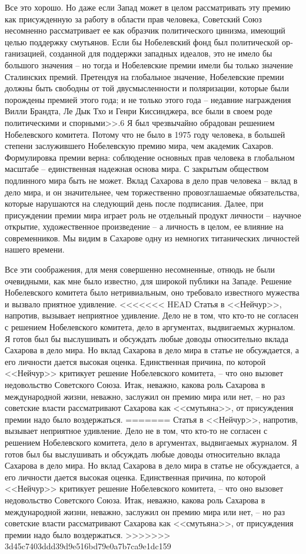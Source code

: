 \documentclass{book}
\begin{document}
{Все это хорошо. Но даже если Запад может в целом рассмат­ривать эту премию как присужденную за работу в области прав человека, Советский Союз несомненно рассматривает ее как образчик политического цинизма, имеющий целью поддержку смутьянов. Если бы Нобелевский фонд был политической ор­ганизацией, созданной для поддержки западных идеалов, это не имело бы большого значения -- но тогда и Нобелевские премии имели бы только значение Сталинских премий. Пре­тендуя на глобальное значение, Нобелевские премии должны быть свободны от той двусмысленности и поляризации, кото­рые были порождены премией этого года; и не только этого года -- недавние награждения Вилли Брандта, Ле Дык Тхо и Генри Киссинджера, все были в своем роде политическими и спорными>>.6
Я был чрезвычайно обрадован решением Нобелевского комитета. Потому что не было в 1975 году человека, в большей степени заслужившего Нобелевскую премию мира, чем акаде­мик Сахаров. Формулировка премии верна: соблюдение основ­ных прав человека в глобальном масштабе -- единственная на­дежная основа мира. С закрытым обществом подлинного мира быть не может. Вклад Сахарова в дело прав человека -- вклад в дело мира, и он значительнее, чем торжественно провозгла­шаемые обязательства, которые нарушаются на следующий день после подписания. Далее, при присуждении премии мира играет роль не отдельный продукт личности -- научное открытие, художественное произведение -- а личность в целом, ее влияние на современников. Мы видим в Сахарове одну из немногих титанических личностей нашего времени.

Все эти соображения, для меня совершенно несомненные, отнюдь не были очевидными, как мне было известно, для широ­кой публики на Западе. Решение Нобелевского комитета было нетривиальным, оно требовало известного мужества и вызвало приятное удивление.
<<<<<<< HEAD
Статья в <<Нейчур>>, напротив, вызывает неприятное удив­ление. Дело не в том, что кто‑то не согласен с решением Нобе­левского комитета, дело в аргументах, выдвигаемых журналом. Я готов был бы выслушивать и обсуждать любые доводы отно­сительно вклада Сахарова в дело мира. Но вклад Сахарова в дело мира в статье не обсуждается, а его личности дается высо­кая оценка. Единственная причина, по которой <<Нейчур>> кри­тикует решение Нобелевского комитета, -- что оно вызовет недовольство Советского Союза. Итак, неважно, какова роль Сахарова в международной жизни, неважно, заслужил он пре­мию мира или нет, -- но раз советские власти рассматривают Сахарова как <<смутьяна>>, от присуждения премии надо было воздержаться.
=======
Статья в <<Нейчур>>, напротив, вызывает неприятное удив­ление. Дело не в том, что кто-то не согласен с решением Нобе­левского комитета, дело в аргументах, выдвигаемых журналом. Я готов был бы выслушивать и обсуждать любые доводы отно­сительно вклада Сахарова в дело мира. Но вклад Сахарова в дело мира в статье не обсуждается, а его личности дается высо­кая оценка. Единственная причина, по которой <<Нейчур>> кри­тикует решение Нобелевского комитета, -- что оно вызовет недовольство Советского Союза. Итак, неважно, какова роль Сахарова в международной жизни, неважно, заслужил он пре­мию мира или нет, -- но раз советские власти рассматривают Сахарова как <<смутьяна>>, от присуждения премии надо было воздержаться.
>>>>>>> 3d45c7403ddd39d9e516bd79e0a7b7ca9e1dc159

}
\end{document}
